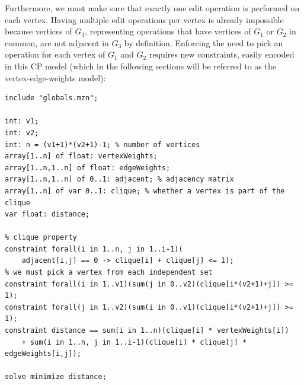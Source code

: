 \documentclass{article}
\newtheorem{theorem}{Theorem}
\theoremstyle{definition}
\begin{document}
Furthermore, we must make sure that exactly one edit operation is performed on each vertex. Having multiple edit operations per vertex is already impossible because vertices of $G_3$, representing operations that have vertices of $G_1$ or $G_2$ in common, are not adjacent in $G_3$ by definition. Enforcing the need to pick an operation for each vertex of $G_1$ and $G_2$ requires new constraints, easily encoded in this CP model (which in the following sections will be referred to as the vertex-edge-weights model):
\begin{lstlisting}
include "globals.mzn";

int: v1;
int: v2;
int: n = (v1+1)*(v2+1)-1; % number of vertices
array[1..n] of float: vertexWeights;
array[1..n,1..n] of float: edgeWeights;
array[1..n,1..n] of 0..1: adjacent; % adjacency matrix
array[1..n] of var 0..1: clique; % whether a vertex is part of the clique
var float: distance;

% clique property
constraint forall(i in 1..n, j in 1..i-1)(
    adjacent[i,j] == 0 -> clique[i] + clique[j] <= 1);
% we must pick a vertex from each independent set
constraint forall(i in 1..v1)(sum(j in 0..v2)(clique[i*(v2+1)+j]) >= 1);
constraint forall(j in 1..v2)(sum(i in 0..v1)(clique[i*(v2+1)+j]) >= 1);
constraint distance == sum(i in 1..n)(clique[i] * vertexWeights[i])
    + sum(i in 1..n, j in 1..i-1)(clique[i] * clique[j] * edgeWeights[i,j]);

solve minimize distance;
\end{lstlisting}
\end{document}
